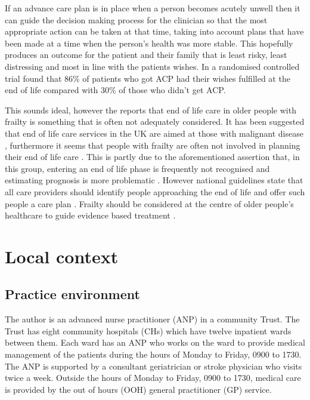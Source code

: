 \documentclass
[
	12pt,
	a4paper,
	oneside,
]{report}
\begin{document}
If an advance care plan is in place when a person becomes acutely unwell then it
can guide the decision making process for the clinician so that the most appropriate
action can be taken at that time, taking into account plans that have been made 
at a time when the person's health was more stable. This hopefully produces an
outcome for the patient and their family that is least risky, least distressing
and most in line with the patients wishes. In a randomised controlled trial
\textcite{detering:10} found that 86\% of patients who got ACP had their wishes
fulfilled at the end of life compared with 30\% of those who didn't get ACP.

This sounds ideal, however the \textcite{silver:12} reports that end of life care 
in older people with frailty
is something that is often not adequately considered. It has been suggested that 
end of life care services in the UK are aimed at those with malignant 
disease \parencite{sharp:13}, furthermore it seems that people with frailty 
are often not involved in planning their 
end of life care \textcite{oliver:14}. This is partly due to the aforementioned 
assertion 
that, in this group, entering an end of life phase is frequently not recognised 
\textcite{wallington:16} and
estimating prognosis is more problematic \parencite{silver:12}. However national
guidelines state that all care providers should identify people approaching 
the end of life and offer such people a care plan \parencite{dh:09}.
Frailty should be considered at the centre of older people's healthcare to guide
evidence based treatment \parencite{woo:14}.

\section{Local context}

\subsection{Practice environment}
\label{sec:local-practice}
The author is an advanced nurse practitioner (ANP) in a community Trust.
The Trust has eight community hospitals (CHs) which have twelve inpatient 
wards between them. Each ward has
an ANP who works on the ward to provide medical management of the patients during 
the hours of Monday to Friday, 0900 to 1730. The ANP is supported by a consultant
geriatrician or stroke physician who visits twice a week. Outside the hours of 
Monday to Friday, 0900 to 1730, medical care 
is provided by the out of hours (OOH) general practitioner (GP) service. 
\end{document}
